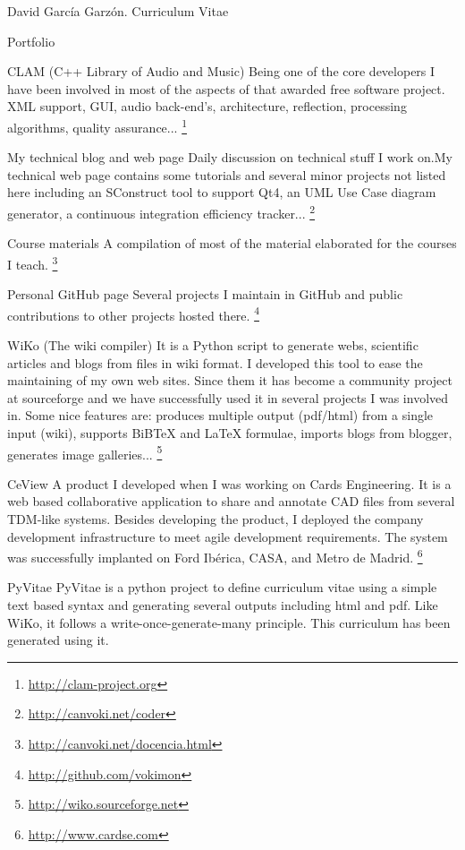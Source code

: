 \documentclass{article}
\begin{document}
\begin{cv}{David García Garzón. Curriculum Vitae}
\begin{cvlist}{Portfolio}
\item[CLAM (C++ Library of Audio and Music)]
Being one of the core developers I have been involved in most of the aspects of that awarded free software project. XML support, GUI, audio back-end's, architecture, reflection, processing algorithms, quality assurance...
\footnote{\href{http://clam-project.org}{http://clam-project.org}}
\item[My technical blog and web page]
Daily discussion on technical stuff I work on.My technical web page contains some tutorials and several minor projects not listed here including an SConstruct tool to support Qt4, an UML Use Case diagram generator, a continuous integration efficiency tracker...
\footnote{\href{http://canvoki.net/coder}{http://canvoki.net/coder}}
\item[Course materials]
A compilation of most of the material elaborated for the courses I teach.
\footnote{\href{http://canvoki.net/docencia.html}{http://canvoki.net/docencia.html}}
\item[Personal GitHub page]
Several projects I maintain in GitHub and public contributions to other projects hosted there.
\footnote{\href{http://github.com/vokimon}{http://github.com/vokimon}}
\item[WiKo (The wiki compiler)]
It is a Python script to generate webs, scientific articles and blogs from files in wiki format. I developed this tool to ease the maintaining of my own web sites. Since them it has become a community project at sourceforge and we have successfully used it in several projects I was involved in. Some nice features are: produces multiple output (pdf/html) from a single input (wiki), supports BiBTeX and LaTeX formulae, imports blogs from blogger, generates image galleries... 
\footnote{\href{http://wiko.sourceforge.net}{http://wiko.sourceforge.net}}
\item[CeView]
A product I developed when I was working on Cards Engineering. It is a web based collaborative application to share and annotate CAD files from several TDM-like systems. Besides developing the product, I deployed the company development infrastructure to meet agile development requirements. The system was successfully implanted on Ford Ibérica, CASA, and Metro de Madrid. 
\footnote{\href{http://www.cardse.com}{http://www.cardse.com}}
\item[PyVitae]
PyVitae is a python project to define curriculum vitae using a simple text based syntax and generating several outputs including html and pdf. Like WiKo, it follows a write-once-generate-many principle. This curriculum has been generated using it.

\end{cvlist}


\vspace{2cm}

\end{cv}
\end{document}
